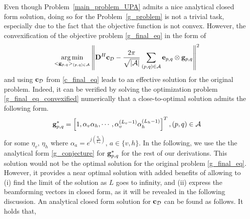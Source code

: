 Even though Problem~\ref{main_problem_UPA} admits a nice analytical closed form solution, doing so for the Problem~\ref{g_problem} is not a trivial task, especially due to the fact that the objective function is not convex. However, the convexification of the objective problem \eqref{g_final_eq} in the form of 
\begin{align}
 \underset{<{\bf{g}}_{p,q}>_{(p,q)\in\mathcal{A}}}{\arg\min }
 \left\| {\bf{D}}^H {\bf{c}}_{\mathcal{D}}- \frac{{2\pi}}{\sqrt{|\mathcal{A}|}} \sum_{(p,q)\in \mathcal{A}}\mathbf{e}_{p,q} \otimes \mathbf{g}_{p,q} \right\|^{2} \label{g_final_eq_convexified}
\end{align} 
and using ${\bf{c}}_{\mathcal{D}}$ from \eqref{c_final_eq} leads to an effective solution for the original problem.
Indeed, it can be verified by solving the optimization problem \eqref{g_final_eq_convexified} numerically that a close-to-optimal solution admits the following form.
\begin{align}
    {\bf{g}}^*_{p,q} = \left[{ 1,  \alpha_v \alpha_h, \cdots,  \alpha_v^{ (L_v -1)}\alpha_h^{ (L_h -1)} }\right]^T, (p,q) \in \mathcal{A} \label{g_conjecture}
\end{align}
for some $\eta_v$, $\eta_h$  where $\alpha_a = e^{j(\frac{\eta_a}{L_a})}$, $a \in \{v, h\}$. \label{proposiiton_g}
%
In the following, we use the the analytical form \eqref{g_conjecture} for ${\bf{g}}^*_{p,q}$ for the rest of our derivations. This solution would not be the optimal solution for the original problem \eqref{g_final_eq}.  However, it provides a near optimal solution with added benefits of allowing to (i) find the limit of the solution as $L$ goes to infinity, and (ii) express the beamforming vectors in closed form, as it will be revealed in the following discussion. An analytical closed form solution for ${\bf{c}}_\mathcal{D}$ can be found as follows. It holds that, 
